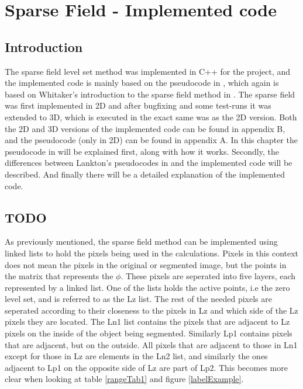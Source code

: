 \chapter{Sparse Field - Implemented code}
\section{Introduction}
The sparse field level set method was implemented in C++ for the project, and the implemented code is mainly based on the pseudocode in \cite{lankton09}, which again is based on Whitaker's introduction to the sparse field method in \cite{whitaker89}. 
The sparse field was first implemented in 2D and after bugfixing and some test-runs it was extended to 3D, which is executed in the exact same was as the 2D version. Both the 2D and 3D versions of the implemented code can be found in appendix B, and the pseudocode (only in 2D) can be found in appendix A. In this chapter the pseudocode in \cite{lankton09} will be explained first, along with how it works. Secondly, the differences between Lankton's pseudocodes in \cite{lankton09} and the implemented code will be described. And finally there will be a detailed explanation of the implemented code.

\section{TODO}
As previously mentioned, the sparse field method can be implemented using linked lists to hold the pixels being used in the calculations. Pixels in this context does not mean the pixels in the original or segmented image, but the points in the matrix that represents the $\phi$. These pixels are seperated into five layers, each represented by a linked list. One of the lists holds the active points, i.e the zero level set, and is referred to as the Lz list. The rest of the needed pixels are seperated according to their closeness to the pixels in Lz and which side of the Lz pixels they are located. The Ln1 list contains the pixels that are adjacent to Lz pixels on the inside of the object being segmented. Similarly Lp1 contains pixels that are adjacent, but on the outside. All pixels that are adjacent to those in Ln1 except for those in Lz are elements in the Ln2 list, and similarly the ones adjacent to Lp1 on the opposite side of Lz are part of Lp2. This becomes more clear when looking at table \ref{rangeTab1} and figure \ref{labelExample}. 

